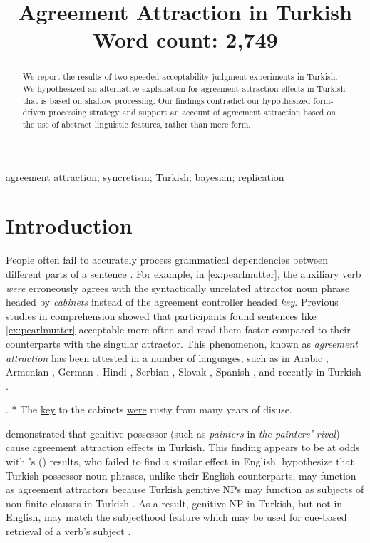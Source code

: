 \documentclass[brill,linguex]{glossa}\usepackage[]{graphicx}\usepackage[]{color}
\title[Agreement Attraction in Turkish]{Agreement Attraction in Turkish\\ \bigskip \large Word count: 2,749}
\author[A.B. \& C.D.]%
{%
  \spauthor{\texttt{Hidden Hidden (A.B.)}\\ 
  \institute{\texttt{Hidden University}}\\
  \small{
    \texttt{hidden@hidden.edu}}
  }
  \AND
  \spauthor{\texttt{Hidden Hidden (C.D.)}\\ 
  \institute{\texttt{Hidden University}}\\
  \small{
    \texttt{hidden@hidden.edu}}
  }%
}
\begin{document}
\sffamily
\maketitle


\begin{abstract}
We report the results of two speeded acceptability judgment experiments in Turkish. We hypothesized an alternative explanation for agreement attraction effects in Turkish that is based on shallow processing. Our findings contradict our hypothesized form-driven processing strategy and support an account of agreement attraction based on the use of abstract linguistic features, rather than mere form.
\end{abstract}

\begin{keywords}
  agreement attraction; syncretism; Turkish; bayesian; replication
\end{keywords}

\rmfamily


\section{Introduction}

People often fail to accurately process grammatical dependencies between different parts of a sentence \citep[e.g.,][]{GibsonThomas:1999,PhillipsEtAl:2011}. For example, in \ref{ex:pearlmutter}, the auxiliary verb \textit{were} erroneously agrees with the syntactically unrelated attractor noun phrase headed by \textit{cabinets} instead of the agreement controller headed \textit{key}. Previous  studies in comprehension \citep{NicolEtAl:1997, PearlmutterGarnseyBock:1999} showed that participants found sentences like \ref{ex:pearlmutter} acceptable more often and read them faster compared to their counterparts with the singular attractor. This phenomenon, known as \textit{agreement attraction} \citep{BockMiller:1991} has been attested in a number of languages, such as in Arabic \citep{TuckerEtAl:2015}, Armenian \citep{AvetisyanEtAl:2020}, German \citep{LagoFelser:2018}, Hindi \citep{BhatiaDillon:2020}, Serbian \citep{RisticEtAl:2016}, Slovak \citep{BadeckerKuminiak:2007}, Spanish \citep{LagoEtAl:2015}, and recently in Turkish \citep{LagoEtAl:2019}.


\ex. \label{ex:pearlmutter} * The \underline{key} to the cabinets \underline{were} rusty from many years of disuse. 


\citet{LagoEtAl:2019} demonstrated that genitive possessor (such as \textit{painters} in \textit{the painters' rival}) cause agreement attraction effects in Turkish. This finding appears to be at odds with \citeauthor{NicolEtAl:2016}'s (\citeyear{NicolEtAl:2016}) results, who failed to find a similar effect in English. \citet{LagoEtAl:2019} hypothesize that Turkish possessor noun phrases, unlike their English counterparts, may function as agreement attractors because Turkish genitive NPs may function as subjects of non-finite clauses in Turkish \citep{GokselKerslake:2005,Kornfilt:2011}. As a result, genitive NP in Turkish, but not in English, may match the subjecthood feature which may be used for cue-based retrieval of a verb's subject \citep{LewisVasishth:2005, ArnettWagers:2017}.
\end{document}
